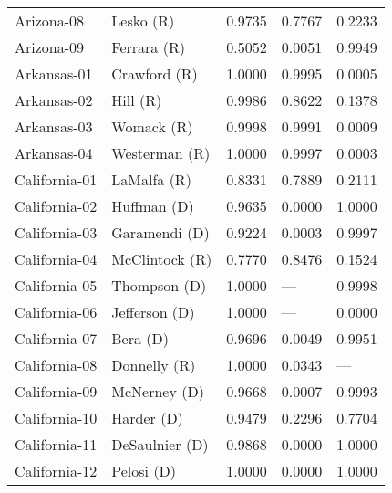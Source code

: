 \begin{longtable}{llrll}
        Arizona-08 &             {\color{Red} Lesko (R)} &       0.9735 &        0.7767 &        0.2233 \\
        Arizona-09 &           {\color{Red} Ferrara (R)} &       0.5052 &        0.0051 &        0.9949 \\
       Arkansas-01 &          {\color{Red} Crawford (R)} &       1.0000 &        0.9995 &        0.0005 \\
       Arkansas-02 &              {\color{Red} Hill (R)} &       0.9986 &        0.8622 &        0.1378 \\
       Arkansas-03 &            {\color{Red} Womack (R)} &       0.9998 &        0.9991 &        0.0009 \\
       Arkansas-04 &         {\color{Red} Westerman (R)} &       1.0000 &        0.9997 &        0.0003 \\
     California-01 &           {\color{Red} LaMalfa (R)} &       0.8331 &        0.7889 &        0.2111 \\
     California-02 &          {\color{Blue} Huffman (D)} &       0.9635 &        0.0000 &        1.0000 \\
     California-03 &        {\color{Blue} Garamendi (D)} &       0.9224 &        0.0003 &        0.9997 \\
     California-04 &        {\color{Red} McClintock (R)} &       0.7770 &        0.8476 &        0.1524 \\
     California-05 &         {\color{Blue} Thompson (D)} &       1.0000 &           --- &        0.9998 \\
     California-06 &        {\color{Blue} Jefferson (D)} &       1.0000 &           --- &        0.0000 \\
     California-07 &             {\color{Blue} Bera (D)} &       0.9696 &        0.0049 &        0.9951 \\
     California-08 &          {\color{Red} Donnelly (R)} &       1.0000 &        0.0343 &           --- \\
     California-09 &         {\color{Blue} McNerney (D)} &       0.9668 &        0.0007 &        0.9993 \\
     California-10 &           {\color{Blue} Harder (D)} &       0.9479 &        0.2296 &        0.7704 \\
     California-11 &       {\color{Blue} DeSaulnier (D)} &       0.9868 &        0.0000 &        1.0000 \\
     California-12 &           {\color{Blue} Pelosi (D)} &       1.0000 &        0.0000 &        1.0000 \\

\end{longtable}
